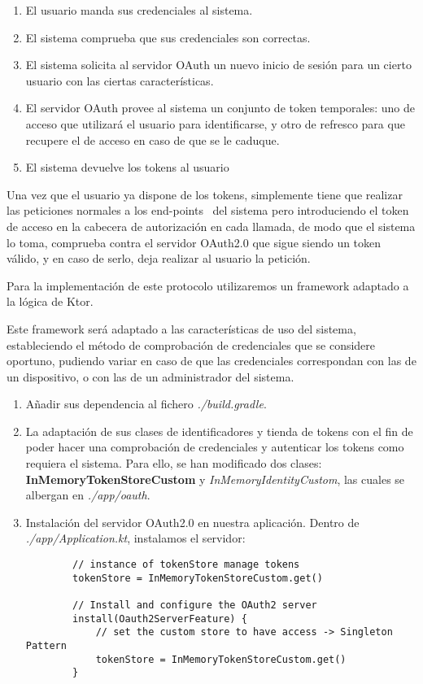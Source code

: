 \begin{enumerate}
        \item El usuario manda sus credenciales al sistema.
        \item El sistema comprueba que sus credenciales son correctas.
        \item El sistema solicita al servidor OAuth un nuevo inicio de sesión para un cierto usuario con las ciertas características.
        \item El servidor OAuth provee al sistema un conjunto de token temporales: uno de acceso que utilizará el usuario para identificarse, y otro de refresco para que recupere el de acceso en caso de que se le caduque.
        \item El sistema devuelve los tokens al usuario
\end{enumerate}
Una vez que el usuario ya dispone de los tokens, simplemente tiene que realizar las peticiones normales a los end-points~\cite{endpoint} del sistema pero introduciendo el token de acceso en la cabecera de autorización en cada llamada, de modo que el sistema lo toma, comprueba contra el servidor OAuth2.0 que sigue siendo un token válido, y en caso de serlo, deja realizar al usuario la petición.

Para la implementación de este protocolo utilizaremos un framework adaptado a la lógica de Ktor.~\cite{myndocs.oauth2}

Este framework será adaptado a las características de uso del sistema, estableciendo el método de comprobación de credenciales que se considere oportuno, pudiendo variar en caso de que las credenciales correspondan con las de un dispositivo, o con las de un administrador del sistema.

\begin{enumerate}
    \item Añadir sus dependencia al fichero \textit{./build.gradle}.
    \item La adaptación de sus clases de identificadores y tienda de tokens con el fin de poder hacer una comprobación de credenciales y autenticar los tokens como requiera el sistema. Para ello, se han modificado dos clases: \textbf{InMemoryTokenStoreCustom} y \textit{InMemoryIdentityCustom}, las cuales se albergan en \textit{./app/oauth}.
    \item Instalación del servidor OAuth2.0 en nuestra aplicación.
    Dentro de \textit{./app/Application.kt}, instalamos el servidor:

    \begin{lstlisting}
        // instance of tokenStore manage tokens
        tokenStore = InMemoryTokenStoreCustom.get()
        
        // Install and configure the OAuth2 server
        install(Oauth2ServerFeature) {
            // set the custom store to have access -> Singleton Pattern
            tokenStore = InMemoryTokenStoreCustom.get()
        }
    \end{lstlisting}
\end{enumerate}

